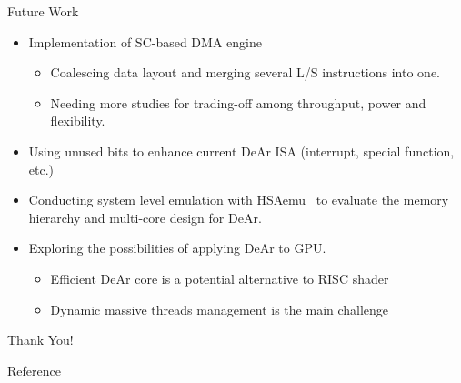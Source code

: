\documentclass{beamer}
\begin{document}
\begin{CJK}{UTF8}{bkai}
            \begin{frame}{Future Work}
                \begin{itemize}
                    \item <2->{Implementation of SC-based DMA engine~\cite{sc}
                            \begin{itemize}
                                \item Coalescing data layout and merging several L/S instructions into one.
                                \item Needing more studies for trading-off among throughput, power and flexibility. 
                            \end{itemize}
                        }
                    \item <3->{Using unused bits to enhance current DeAr ISA (interrupt, special function, etc.)}
                    \item <4->{Conducting system level emulation with HSAemu~\cite{hsaemu} to evaluate the memory hierarchy and multi-core design for DeAr.}
                    \item <5->{Exploring the possibilities of applying DeAr to GPU.
                            \begin{itemize}
                                \item Efficient DeAr core is a potential alternative to RISC shader
                                \item Dynamic massive threads management is the main challenge
                            \end{itemize}
                        }
                \end{itemize}

            \end{frame}

            \begin{frame}[plain,c]
                \centering
                \Huge{Thank You!}
            \end{frame}

            \begin{frame}[allowframebreaks]{Reference}
                \printbibliography
            \end{frame}


        \end{CJK}
        
\end{document}
